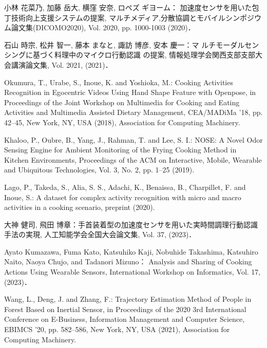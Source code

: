 \begin{thebibliography}{参考文献}
	小林 花菜乃, 加藤 岳大, 横窪 安奈, ロペズ ギヨーム：
	加速度センサを用いた包丁技術向上支援システムの提案, マルチメディア,分散協調とモバイルシンポジウム論文集(DICOMO2020), Vol. 2020, pp. 1000-1003 (2020)．
	
	石山 時宗, 松井 智一, 藤本 まなと, 諏訪 博彦, 安本 慶一：マ
	ルチモーダルセンシングに基づく料理中のマイクロ行動認識
	の提案, 情報処理学会関西支部支部大会講演論文集, Vol. 2021, (2021)．

	Okumura, T., Urabe, S., Inoue, K. and Yoshioka, M.: Cooking Activities Recognition in Egocentric Videos Using Hand Shape Feature with Openpose, in Proceedings of the Joint Workshop on Multimedia for Cooking and Eating Activities and Multimedia Assisted Dietary Management, CEA/MADiMa ’18, pp. 42–45, New York, NY, USA (2018), Association for Computing Machinery.

	Khaloo, P., Oubre, B., Yang, J., Rahman, T. and Lee, S. I.: NOSE: A Novel Odor Sensing Engine for Ambient Monitoring of the Frying Cooking Method in Kitchen Environments, Proceedings of the ACM on Interactive, Mobile, Wearable and Ubiquitous Technologies, Vol. 3, No. 2, pp. 1–25 (2019).

	Lago, P., Takeda, S., Alia, S. S., Adachi, K., Benaissa, B., Charpillet, F. and Inoue, S.: A dataset for complex activity recognition with micro and macro activities in a cooking scenario, preprint (2020).

	大神 健司, 飛田 博章：手首装着型の加速度センサを用いた実時間調理行動認識手法の実現, 人工知能学会全国大会論文集, Vol. 37, (2023)．

	Ayato Kumazawa, Fuma Kato, Katsuhiko Kaji, Nobuhide Takashima, Katsuhiro Naito, Naoya Chujo, and Tadanori Mizuno：
	Analysis and Sharing of Cooking Actions Using Wearable Sensors, International Workshop on Informatics, Vol. 17, (2023)．

	Wang, L., Deng, J. and Zhang, F.: Trajectory Estimation Method of People in Forest Based on Inertial Sensor, in Proceedings of the 2020 3rd International Conference on E-Business, Information Management and Computer Science, EBIMCS ’20, pp. 582–586, New York, NY, USA (2021), Association for Computing Machinery.


\end{thebibliography}
